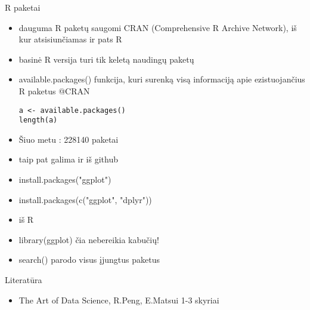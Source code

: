 \documentclass[11pt,xcolor=table]{beamer}
\begin{document}

\begin{frame}[fragile]{R paketai}
\begin{itemize}
\item dauguma R paketų saugomi CRAN (Comprehensive R Archive Network), iš kur atsisiunčiamas ir pats R
\item basinė R versija turi tik keletą naudingų paketų
\item available.packages() funkcija, kuri surenką visą informaciją apie ezistuojančius R paketus @CRAN
\begin{lstlisting}
a <- available.packages()
length(a)
\end{lstlisting}
\item Šiuo metu : 228140 paketai
\item taip pat galima ir iš github
\item install.packages("ggplot")
\item  install.packages(c("ggplot", "dplyr"))
\item iš R 
\item library(ggplot) čia nebereikia kabučių!
\item search() parodo visus įjungtus paketus
\end{itemize}
\end{frame}

\begin{frame}{Literatūra}
\begin{itemize}
\item The Art of Data Science, R.Peng, E.Matsui 1-3 skyriai
\end{itemize}
\end{frame}


\end{document}
